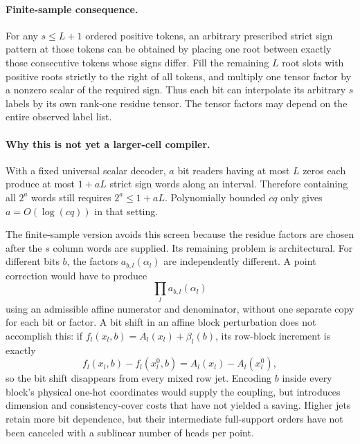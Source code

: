 \documentclass{article}
\begin{document}
\paragraph{Finite-sample consequence.}
For any $s\leq L+1$ ordered positive tokens, an arbitrary prescribed
strict sign pattern at those tokens can be obtained by placing one
root between exactly those consecutive tokens whose signs differ.
Fill the remaining $L$ root slots with positive roots strictly to the
right of all tokens, and multiply one tensor factor by a nonzero
scalar of the required sign.  Thus each bit can interpolate its
arbitrary $s$ labels by its own rank-one residue tensor.  The tensor
factors may depend on the entire observed label list.

\paragraph{Why this is not yet a larger-cell compiler.}
With a fixed universal scalar decoder, $a$ bit readers having at most
$L$ zeros each produce at most $1+aL$ strict sign words along an
interval.  Therefore containing all $2^a$ words still requires
$2^a\leq1+aL$.  Polynomially bounded $cq$ only gives
$a=O(\log(cq))$ in that setting.

The finite-sample version avoids this screen because the residue
factors are chosen after the $s$ column words are supplied.  Its
remaining problem is architectural.  For different bits $b$, the
factors $a_{b,l}(\alpha_l)$ are independently different.  A point
correction would have to produce
\[
 \prod_l a_{b,l}(\alpha_l)
\]
using an admissible affine numerator and denominator, without one
separate copy for each bit or factor.  A bit shift in an affine block
perturbation does not accomplish this: if
$f_l(x_l,b)=A_l(x_l)+\beta_l(b)$, its row-block increment is exactly
\[
 f_l(x_l,b)-f_l(x_l^0,b)=A_l(x_l)-A_l(x_l^0),
\]
so the bit shift disappears from every mixed row jet.  Encoding $b$
inside every block's physical one-hot coordinates would supply the
coupling, but introduces dimension and consistency-cover costs that
have not yielded a saving.  Higher jets retain more bit dependence,
but their intermediate full-support orders have not been canceled
with a sublinear number of heads per point.
\end{document}
